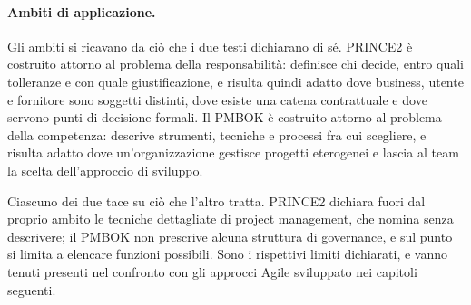\paragraph{Ambiti di applicazione.} Gli ambiti si ricavano da ci\`o che i due
testi dichiarano di s\'e. PRINCE2 \`e costruito attorno al problema della
responsabilit\`a: definisce chi decide, entro quali tolleranze e con quale
giustificazione, e risulta quindi adatto dove business, utente e fornitore sono
soggetti distinti, dove esiste una catena contrattuale e dove servono punti di
decisione formali. Il PMBOK \`e costruito attorno al problema della competenza:
descrive strumenti, tecniche e processi fra cui scegliere, e risulta adatto dove
un'organizzazione gestisce progetti eterogenei e lascia al team la scelta
dell'approccio di sviluppo.

Ciascuno dei due tace su ci\`o che l'altro tratta. PRINCE2 dichiara fuori dal
proprio ambito le tecniche dettagliate di project management, che nomina senza
descrivere; il PMBOK non prescrive alcuna struttura di
governance, e sul punto si limita a elencare funzioni possibili.
Sono i rispettivi limiti dichiarati, e vanno tenuti presenti nel confronto con
gli approcci Agile sviluppato nei capitoli seguenti.
